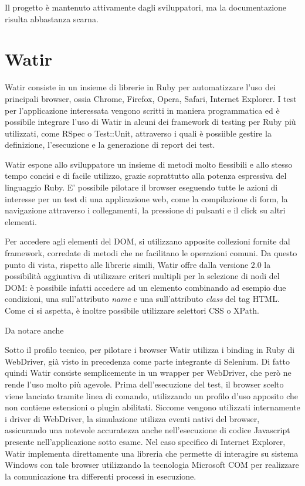 \documentclass[12pt]{toptesi}
\begin{document}
Il progetto è mantenuto attivamente dagli sviluppatori, ma la documentazione risulta abbastanza scarna. %

\section{Watir}

Watir consiste in un insieme di librerie in Ruby per automatizzare l'uso dei principali browser, ossia Chrome, Firefox, Opera, Safari, Internet Explorer. I test per l'applicazione interessata vengono scritti in maniera programmatica ed è possibile integrare l'uso di Watir in alcuni dei framework di testing per Ruby più utilizzati, come RSpec o Test::Unit, attraverso i quali è possiible gestire la definizione, l'esecuzione e la generazione di report dei test.

Watir espone allo sviluppatore un insieme di metodi molto flessibili e allo stesso tempo concisi e di facile utilizzo, grazie soprattutto alla potenza espressiva del linguaggio Ruby. E' possibile pilotare il browser eseguendo tutte le azioni di interesse per un test di una applicazione web, come la compilazione di form, la navigazione attraverso i collegamenti, la pressione di pulsanti e il click su altri elementi. 

Per accedere agli elementi del DOM, si utilizzano apposite collezioni fornite dal framework, corredate di metodi che ne facilitano le operazioni comuni. Da questo punto di vista, rispetto alle librerie simili, Watir offre dalla versione 2.0 la possibilità aggiuntiva di utilizzare criteri multipli per la selezione di nodi del DOM: è possibile infatti accedere ad un elemento combinando ad esempio due condizioni, una sull'attributo \emph{name} e una sull'attributo \emph{class} del tag HTML. Come ci si aspetta, è inoltre possibile utilizzare selettori CSS o XPath.

Da notare anche 

Sotto il profilo tecnico, per pilotare i browser Watir utilizza i binding in Ruby di WebDriver, già visto in precedenza come parte integrante di Selenium. Di fatto quindi Watir consiste semplicemente in un wrapper per WebDriver, che però ne rende l'uso molto più agevole. Prima dell'esecuzione del test, il browser scelto viene lanciato tramite linea di comando, utilizzando un profilo d'uso apposito che non contiene estensioni o plugin abilitati. Siccome vengono utilizzati internamente i driver di WebDriver, la simulazione utilizza eventi nativi del browser, assicurando una notevole accuratezza anche nell'esecuzione di codice Javascript presente nell'applicazione sotto esame. Nel caso specifico di Internet Explorer, Watir implementa direttamente una libreria che permette di interagire su sistema Windows con tale browser utilizzando la tecnologia Microsoft COM per realizzare la comunicazione tra differenti processi in esecuzione.
\end{document}
